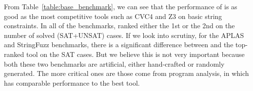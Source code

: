 \begin{table}[h]
\centering
\caption{Results of {\tool}, CVC4, Z3, and Z3-str3 on String-Number Conversion benchmark.}
\label{table:str_int_benchmark}
\end{table}


From Table~\ref{table:base_benchmark}, we can see that the performance of {\tool} is as good as the most competitive tools such as CVC4 and Z3 on basic string constraints. In all of the benchmarks, {\tool} ranked either the 1st or the 2nd on the number of solved (SAT+UNSAT) cases. If we look into scrutiny, for the APLAS and StringFuzz benchmarks, there is a significant difference between {\tool} and the top-ranked tool on the SAT cases. But we believe this is not very important because both these two benchmarks are artificial, either hand-crafted or randomly generated. The more critical ones are those come from program analysis, in which {\tool} has comparable performance to the best tool.

